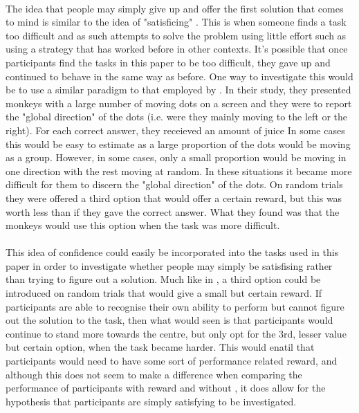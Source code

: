 \documentclass[12pt]{article}
\begin{document}
\paragraph{} The idea that people may simply give up and offer the first solution that comes to mind is similar to the idea of "satisficing" \citep{simon1990invariants}. This is when someone finds a task too difficult and as such attempts to solve the problem using little effort such as using a strategy that has worked before in other contexts. It's possible that once participants find the tasks in this paper to be too difficult, they gave up and continued to behave in the same way as before. One way to investigate this would be to use a similar paradigm to that employed by \cite{Kiani759}. In their study, they presented monkeys with a large number of moving dots on a screen and they were to report the "global direction" of the dots (i.e. were they mainly moving to the left or the right). For each correct answer, they receieved an amount of juice In some cases this would be easy to estimate as a large proportion of the dots would be moving as a group. However, in some cases, only a small proportion would be moving in one direction with the rest moving at random. In these situations it became more difficult for them to discern the "global direction" of the dots. On random trials they were offered a third option that would offer a certain reward, but this was worth less than if they gave the correct answer. What they found was that the monkeys would use this option when the task was more difficult. 

\paragraph{} This idea of confidence could easily be incorporated into the tasks used in this paper in order to investigate whether people may simply be satisfising rather than trying to figure out a solution. Much like in \cite{Kiani759}, a third option could be introduced on random trials that would give a small but certain reward. If participants are able to recognise their own ability to perform but cannot figure out the solution to the task, then what would seen is that participants would continue to stand more towards the centre, but only opt for the 3rd, lesser value but certain option, when the task became harder. This would enatil that participants would need to have some sort of performance related reward, and although this does not seem to make a difference when comparing the performance of participants with reward \citep{morvan2012human} and without \citep{clarke2015failure}, it does allow for the hypothesis that participants are simply satisfying to be investigated. %
\end{document}
